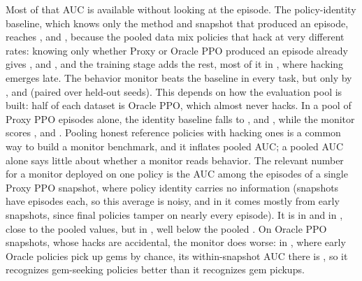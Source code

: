 Most of that AUC is available without looking at the episode. The
policy-identity baseline, which knows only the method and snapshot that
produced an episode, reaches ,
 and
, because the pooled data
mix policies that hack at very different rates: knowing only whether Proxy or
Oracle PPO produced an episode already gives
,
 and
, and the training stage adds the rest,
most of it in \PF{}, where hacking emerges late. The behavior monitor beats the
baseline in every task, but only by
,
 and
 (paired over
held-out seeds). This depends on how the evaluation pool is built: half of each
dataset is Oracle PPO, which almost never hacks. In a pool of Proxy PPO episodes
alone, the identity baseline falls to
,
 and
, while the
monitor scores ,
 and
. Pooling honest reference
policies with hacking ones is a common way to build a monitor benchmark, and it
inflates pooled AUC; a pooled AUC alone says little about whether a monitor
reads behavior. The relevant number for a monitor deployed on one policy is
the AUC among the episodes of a single Proxy PPO snapshot, where policy
identity carries no information (snapshots have  episodes each,
so this average is noisy, and in \ST{} it comes mostly from early snapshots,
since final policies tamper on nearly every episode). It is
 in \ST{} and
 in \GT{}, close to the pooled
values, but  in \PF{}, well
below the pooled . On Oracle PPO
snapshots, whose hacks are accidental, the monitor does worse: in \GT{}, where
early Oracle policies pick up gems by chance, its within-snapshot AUC there is
, so it recognizes
gem-seeking policies better than it recognizes gem pickups.

